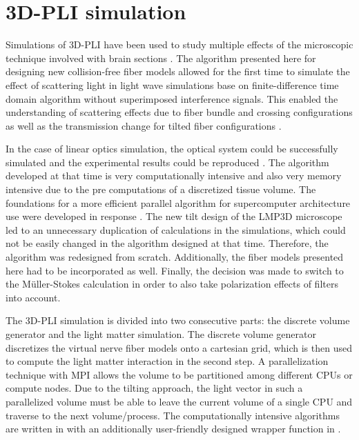 \cleardoublepage
\setcounter{chapter}{5}
\chapter{\acs{3D-PLI} simulation}
\label{cha:sof:simulation}
%
Simulations of \ac{3D-PLI} have been used to study multiple effects of the microscopic technique involved with brain sections \cite{Dohmen2015,Menzel2015,Menzel2016,Menzel2020,Menzel2021,MenzelMaster,MenzelDissertation}.
The algorithm presented here for designing new collision-free fiber models allowed for the first time to simulate the effect of scattering light in light wave simulations base on finite-difference time domain algorithm without superimposed interference signals.
This enabled the understanding of scattering effects due to fiber bundle and crossing configurations as well as the transmission change for tilted fiber configurations \cite{MenzelDissertation,Menzel2020,Menzel2021}.
\par
% 
In the case of linear optics simulation, the optical system could be successfully simulated and the experimental results could be reproduced \cite{Dohmen2015,Menzel2016}.
The algorithm developed at that time is very computationally intensive and also very memory intensive due to the pre computations of a discretized tissue volume.
The foundations for a more efficient parallel algorithm for supercomputer architecture use were developed in response \cite{Lucksch2016}.
The new tilt design of the LMP3D microscope led to an unnecessary duplication of calculations in the simulations, which could not be easily changed in the algorithm designed at that time.
Therefore, the algorithm was redesigned from scratch.
Additionally, the fiber models presented here had to be incorporated as well.
Finally, the decision was made to switch to the M\"{u}ller-Stokes calculation in order to also take polarization effects of filters into account.
\par
%
The \ac{3D-PLI} simulation is divided into two consecutive parts: the discrete volume generator and the light matter simulation.
The discrete volume generator discretizes the virtual nerve fiber models onto a cartesian grid, which is then used to compute the light matter interaction in the second step.
A parallelization technique with \ac{MPI} allows the volume to be partitioned among different \acp{CPU} or compute nodes.
Due to the tilting approach, the light vector in such a parallelized volume must be able to leave the current volume of a single \ac{CPU} and traverse to the next volume/process.
The computationally intensive algorithms are written in \cpp{} with an additionally user-friendly designed wrapper function in \python{}.
%
% 
% 
